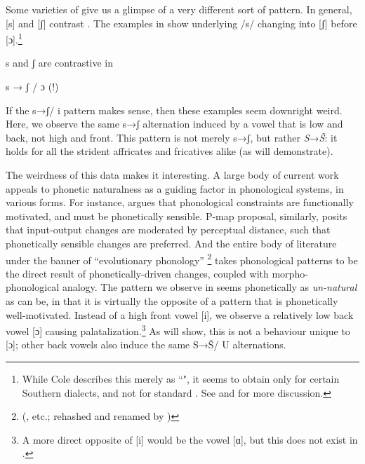 \documentclass[output=paper,newtxmath,modfonts,nonflat,hidelinks]{langsci/langscibook}
\begin{document}
Some varieties of  give us a glimpse of a very different sort of pattern. In general, [s] and [ʃ] contrast . The examples in  \citep[from][]{Cole1955} show underlying /s/ changing into [ʃ] before [ɔ].\footnote{While Cole describes this merely as ``", it seems to obtain only for certain Southern dialects, and not for standard . See  and  for more discussion.}

\ea\label{ex:bennett:1}
s and ʃ are contrastive in  \citep[25]{Cole1955}\\
\z

\ea\label{ex:bennett:2}
s → ʃ / {\longrule} ɔ (!)
\ea\label{ex:bennett:2a}
\ex\label{ex:bennett:2b} 
\ex\label{ex:bennett:2c} 
\z
\z

If the s→ʃ/ {\longrule} i pattern makes sense, then these examples seem downright weird. Here, we observe the same s→ʃ alternation induced by a vowel that is low and back, not high and front. This pattern is not merely s→ʃ, but rather \textit{S}→\textit{Š}: it holds for all the strident affricates and fricatives alike (as  will demonstrate).

The weirdness of this data makes it interesting. A large body of current work appeals to phonetic naturalness as a guiding factor in phonological systems, in various forms. For instance, \citet{Hayes1999} argues that phonological constraints are functionally motivated, and must be phonetically sensible.  P-map proposal, similarly, posits that input-output changes are moderated by perceptual distance, such that phonetically sensible changes are preferred. And the entire body of literature under the banner of ``evolutionary phonology''%
\footnote{(\citealt{Ohala1981,Ohala1990,Ohala:2004aa}, etc.; rehashed and renamed by \citealt{Blevins2004})} takes phonological patterns to be the direct result of phonetically-driven changes, coupled with morpho-phonological analogy. The pattern we observe in  seems phonetically as \textit{un-natural} as can be, in that it is virtually the opposite of a pattern that is phonetically well-motivated. Instead of a high front vowel [i], we observe a relatively low back vowel [ɔ] causing palatalization.\footnote{A more direct opposite of [i] would be the vowel [ɑ], but this does not exist in .} As  will show, this is not a behaviour unique to [ɔ]; other back vowels also induce the same S→Š/ {\longrule} U alternations.
\end{document}
